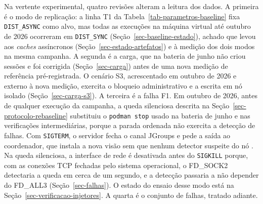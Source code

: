 Na vertente experimental, quatro revisões alteram a leitura dos dados. A primeira é o modo de replicação: a linha T1 da Tabela~\ref{tab-parametros-baseline} fixa \texttt{DIST\_ASYNC} como alvo, mas todas as execuções na máquina virtual até outubro de 2026 ocorreram em \texttt{DIST\_SYNC} (Seção~\ref{sec-baseline-estado}), achado que levou aos \emph{caches} assíncronos (Seção~\ref{sec-estado-artefatos}) e à medição dos dois modos na mesma campanha. A segunda é a carga, que na bateria de junho não criou sessões e foi corrigida (Seção~\ref{sec-carga}) antes de uma nova medição de referência pré-registrada. O cenário S3, acrescentado em outubro de 2026 e externo à nova medição, exercita o bloqueio administrativo e a escrita em nó isolado (Seção~\ref{sec-carga-s3}). A terceira é a falha F1. Em outubro de 2026, antes de qualquer execução da campanha, a queda silenciosa descrita na Seção~\ref{sec-protocolo-rebaseline} substituiu o \texttt{podman stop} usado na bateria de junho e nas verificações intermediárias, porque a parada ordenada não exercita a detecção de falhas. Com \texttt{SIGTERM}, o servidor fecha o canal JGroups e pede a saída ao coordenador, que instala a nova visão sem que nenhum detector suspeite do nó \cite[seções 3.10.13 e 6.8.7]{jgroups_manual_5}. Na queda silenciosa, a interface de rede é desativada antes do \texttt{SIGKILL} porque, com as conexões TCP fechadas pelo sistema operacional, o FD\_SOCK2 detectaria a queda em cerca de um segundo, e a detecção passaria a não depender do FD\_ALL3 (Seção~\ref{sec-falhas}). O estado do ensaio desse modo está na Seção~\ref{sec-verificacao-injetores}. A quarta é o conjunto de falhas, tratado adiante.

